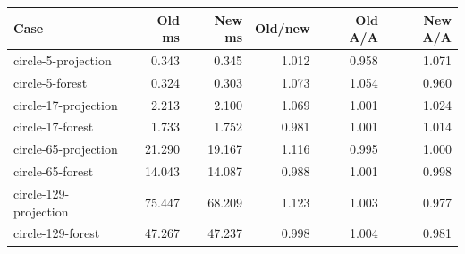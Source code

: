 \begin{center}\small
\begin{tabular}{lrrrrr}
\toprule
Case & Old ms & New ms & Old/new & Old A/A & New A/A \\
\midrule
circle-5-projection & 0.343 & 0.345 & 1.012 & 0.958 & 1.071 \\
circle-5-forest & 0.324 & 0.303 & 1.073 & 1.054 & 0.960 \\
circle-17-projection & 2.213 & 2.100 & 1.069 & 1.001 & 1.024 \\
circle-17-forest & 1.733 & 1.752 & 0.981 & 1.001 & 1.014 \\
circle-65-projection & 21.290 & 19.167 & 1.116 & 0.995 & 1.000 \\
circle-65-forest & 14.043 & 14.087 & 0.988 & 1.001 & 0.998 \\
circle-129-projection & 75.447 & 68.209 & 1.123 & 1.003 & 0.977 \\
circle-129-forest & 47.267 & 47.237 & 0.998 & 1.004 & 0.981 \\
\bottomrule
\end{tabular}
\end{center}
